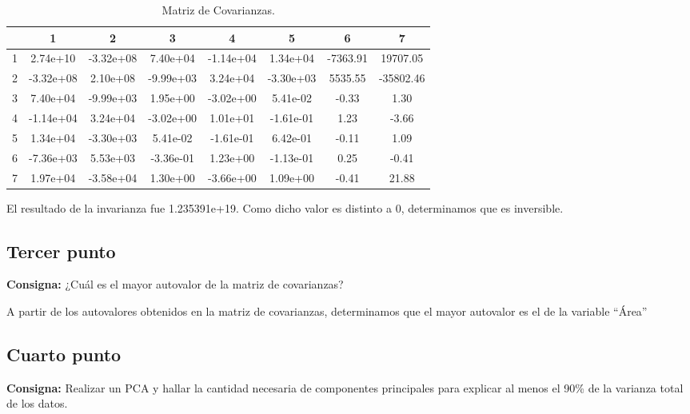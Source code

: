 \documentclass{article} %
\begin{document}
\begin{table}[H]
	\centering
		\begin{tabular}{||l || c | c | c | c | c | c | c ||}
			\hline
			\hline
			 & 1 & 2 & 3 & 4 & 5 & 6 & 7\\
			\hline			
			\hline
			1& 2.74e+10& -3.32e+08 & 7.40e+04 &-1.14e+04&      1.34e+04& -7363.91&      19707.05\\
			\hline
			2& -3.32e+08&  2.10e+08 &-9.99e+03 &3.24e+04&     -3.30e+03& 5535.55 &    -35802.46\\
			\hline
			3 &7.40e+04 &-9.99e+03  &1.95e+00 &-3.02e+00&      5.41e-02& -0.33   &       1.30\\
			\hline
			4 &-1.14e+04&  3.24e+04 &-3.02e+00& 1.01e+01&     -1.61e-01& 1.23    &     -3.66\\
			\hline
			5 &1.34e+04& -3.30e+03  &5.41e-02& -1.61e-01&      6.42e-01& -0.11   &       1.09\\
			\hline
			6 &-7.36e+03&  5.53e+03 &-3.36e-01& 1.23e+00&     -1.13e-01& 0.25    &     -0.41\\
			\hline
			7 &1.97e+04& -3.58e+04  &1.30e+00 &-3.66e+00&      1.09e+00& -0.41   &      21.88\\			
			\hline
			\hline
		\end{tabular}
		\caption{Matriz de Covarianzas.}
			\label{tab:table-punto-3-3}
\end{table}

El resultado de la invarianza fue 1.235391e+19. Como dicho valor es distinto a 0, determinamos que es inversible.

\subsection{Tercer punto}

\textbf{Consigna:} ¿Cuál es el mayor autovalor de la matriz de covarianzas?

A partir de los autovalores obtenidos en la matriz de covarianzas, determinamos que el mayor autovalor es el de la variable ``Área''

\subsection{Cuarto punto}

\textbf{Consigna:} Realizar un PCA y hallar la cantidad necesaria de componentes principales para explicar al menos el 90\% de la varianza total de los datos.
\end{document}
